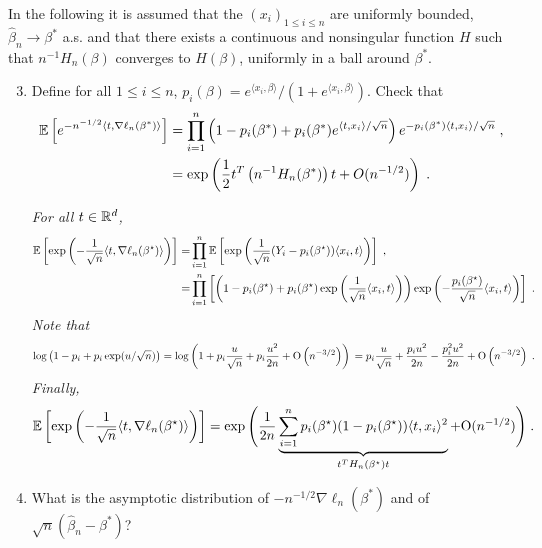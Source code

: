 In the following it is assumed that the $(x_{i})_{1\leqslant i\leqslant n}$ are uniformly bounded, $\widehat \beta_n\to \beta^*$ a.s. and that there exists a continuous and nonsingular function $H$ such that $n^{-1}H_{n}(\beta)$ converges to $H(\beta)$, uniformly in a ball around $\beta^*$.
\begin{enumerate}  \setcounter{enumi}{2}
\item Define for all $1\leqslant i \leqslant n$, $p_{i}(\beta)=e^{\langle x_{i},\beta\rangle}/ \left(1+e^{\langle x_{i},\beta\rangle}\right)$. Check that
\begin{align*}
\mathbb{E} \left[e^{-n^{-1/2}\langle t,\nabla\ell_{n}(\beta^*)\rangle}\right]& =\prod_{i=1}^n \left({1-p_{i}(\beta^*)+p_{i}(\beta^*)e^{\langle t,x_{i}\rangle/\sqrt{n}}}\right) e^{-p_{i}(\beta^*)\langle t,x_{i}\rangle/\sqrt{n}}\;, \\
&=\exp\left(\frac{1}{2}t^T\left(n^{-1}H_{n}(\beta^*)\right)t+O(n^{-1/2})\right)\;.
\end{align*}

\vspace{.2cm}

{\em For all $t\in\mathbb{R}^d$,
\begin{align*}
 \mathbb{E} \left[ \exp\left( - \frac{1}{\sqrt{n}} \langle t, \nabla \ell_n(\beta^{\star}) \rangle \right) \right] = & \prod_{i=1}^n \mathbb{E} \left[ \exp\left( \frac{1}{\sqrt{n}} (Y_i - p_i(\beta^{\star}) )\langle x_i, t \rangle \right) \right]\;,\\
= & \prod_{i=1}^n \left[ \left( 1 - p_i(\beta^{\star}) +  p_i(\beta^{\star}) \exp\left( \frac{1}{\sqrt{n}} \langle x_i, t \rangle \right) \right) \exp \left( - \frac{ p_i(\beta^{\star})}{\sqrt{n}} \langle x_i, t \rangle \right) \right]\;.
\end{align*}
Note that 
\[
\log \left( 1 - p_i + p_i \exp(u/\sqrt{n}) \right) =  \log\left( 1 + p_i \frac{u}{\sqrt{n}} + p_i \frac{u^2}{2n} + \textrm{O} \left( n^{-3/2} \right)\right)\\
 = p_i \frac{u}{\sqrt{n}} + \frac{p_i u^2}{2n} - \frac{p_i^2 u^2}{2n} + \textrm{O} \left( n^{-3/2} \right)\;.
\]
Finally, 
\[
\mathbb{E} \left[ \exp\left( - \frac{1}{\sqrt{n}} \langle t, \nabla \ell_n(\beta^{\star}) \rangle \right) \right] = 
\exp\Bigg( \frac{1}{2n} \underbrace{\sum_{i=1}^n p_i(\beta^{\star}) (1 - p_i(\beta^{\star})) \langle t, x_i \rangle^2}_{t^T H_n(\beta^{\star}) t} + \textrm{O}(n^{-1/2})\Bigg)\;.
\]
}
\item What is the asymptotic distribution of $-n^{-1/2}\nabla\ell_{n}(\beta^*)$ and of $\sqrt{n}(\widehat \beta_n-\beta^*)$?


\end{enumerate}
